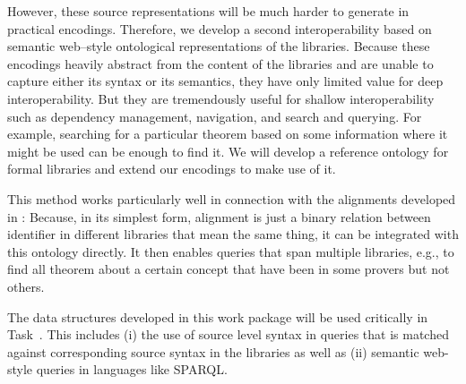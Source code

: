 However, these source representations will be much harder to generate in practical encodings.
Therefore, we develop a second interoperability based on semantic web--style ontological representations of the libraries.
Because these encodings heavily abstract from the content of the libraries and are unable to capture either its syntax or its semantics, they have only limited value for deep interoperability.
But they are tremendously useful for shallow interoperability such as dependency management, navigation, and search and querying.
For example, searching for a particular theorem based on some information where it might be used can be enough to find it.
We will develop a reference ontology for formal libraries and extend our encodings to make use of it.

This method works particularly well in connection with the alignments developed in :
Because, in its simplest form, alignment is just a binary relation between identifier in different libraries that mean the same thing, it can be integrated with this ontology directly.
It then enables queries that span multiple libraries, e.g., to find all theorem about a certain concept that have been in some provers but not others. 

The data structures developed in this work package will be used critically in Task~.
This includes (i) the use of source level syntax in queries that is matched against corresponding source syntax in the libraries as well as (ii) semantic web-style queries in languages like SPARQL.


